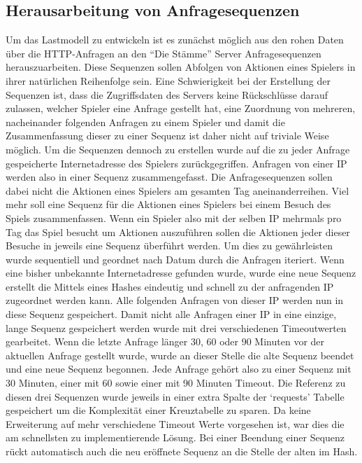 \documentclass[10pt]{scrartcl}
\begin{document}
  \subsection{Herausarbeitung von Anfragesequenzen}
  \label{subsec:request_sequences}
  Um das Lastmodell zu entwickeln ist es zunächst möglich aus den rohen Daten über die HTTP-Anfragen an den ``Die Stämme'' Server Anfragesequenzen herauszuarbeiten. Diese Sequenzen sollen Abfolgen von Aktionen eines Spielers in ihrer natürlichen Reihenfolge sein. Eine Schwierigkeit bei der Erstellung der Sequenzen ist, dass die Zugriffsdaten des Servers keine Rückschlüsse darauf zulassen, welcher Spieler eine Anfrage gestellt hat, eine Zuordnung von mehreren, nacheinander folgenden Anfragen zu einem Spieler und damit die Zusammenfassung dieser zu einer Sequenz ist daher nicht auf triviale Weise möglich. Um die Sequenzen dennoch zu erstellen wurde auf die zu jeder Anfrage gespeicherte Internetadresse des Spielers zurückgegriffen. Anfragen von einer IP werden also in einer Sequenz zusammengefasst. Die Anfragesequenzen sollen dabei nicht die Aktionen eines Spielers am gesamten Tag aneinanderreihen. Viel mehr soll eine Sequenz für die Aktionen eines Spielers bei einem Besuch des Spiels zusammenfassen. Wenn ein Spieler also mit der selben IP mehrmals pro Tag das Spiel besucht um Aktionen auszuführen sollen die Aktionen jeder dieser Besuche in jeweils eine Sequenz überführt werden. Um dies zu gewährleisten wurde sequentiell und geordnet nach Datum durch die Anfragen iteriert. Wenn eine bisher unbekannte Internetadresse gefunden wurde, wurde eine neue Sequenz erstellt die Mittels eines Hashes eindeutig und schnell zu der anfragenden IP zugeordnet werden kann. Alle folgenden Anfragen von dieser IP werden nun in diese Sequenz gespeichert. Damit nicht alle Anfragen einer IP in eine einzige,
  lange Sequenz gespeichert werden wurde mit drei verschiedenen Timeoutwerten gearbeitet. Wenn die letzte Anfrage länger 30, 60 oder 90 Minuten vor der aktuellen Anfrage gestellt wurde, wurde an dieser Stelle die alte Sequenz beendet und eine neue Sequenz begonnen. Jede Anfrage gehört also zu einer Sequenz mit 30 Minuten, einer mit 60 sowie einer mit 90 Minuten Timeout. Die Referenz zu diesen drei Sequenzen wurde jeweils in einer extra Spalte der `requests' Tabelle gespeichert um die Komplexität einer Kreuztabelle zu sparen. Da keine Erweiterung auf mehr verschiedene Timeout Werte vorgesehen ist, war dies die am schnellsten zu implementierende Lösung. Bei einer Beendung einer Sequenz rückt automatisch auch die neu eröffnete Sequenz an die Stelle der alten im Hash.
\end{document}
